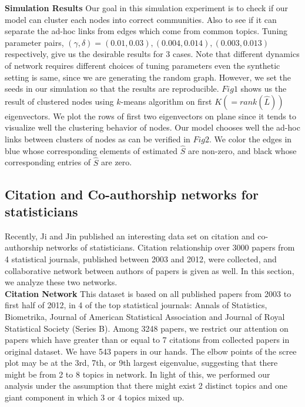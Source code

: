 \documentclass{article}
\begin{document}
\noindent \textbf{Simulation Results} Our goal in this simulation experiment is to check if our model can cluster each nodes into correct communities. Also to see if it can separate the ad-hoc links from edges which come from common topics. Tuning parameter pairs, $(\gamma,\delta) = (0.01,0.03),(0.004,0.014),(0.003,0.013)$ respectively, give us the desirable results for 3 cases. Note that different dynamics of network requires different choices of tuning parameters even the synthetic setting is same, since we are generating the random graph. However, we set the seeds in our simulation so that the results are reproducible. $Fig1$ shows us the result of clustered nodes using $k$-means algorithm on first $K(=rank(\hat{L}))$ eigenvectors. We plot the rows of first two eigenvectors on plane since it tends to visualize well the clustering behavior of nodes. Our model chooses well the ad-hoc links between clusters of nodes as can be verified in $Fig2$. We color the edges in blue whose corresponding elements of estimated $\hat{S}$ are non-zero, and black whose corresponding entries of $\hat{S}$ are zero. 

\subsection{Citation and Co-authorship networks for statisticians }
Recently, Ji and Jin \cite{ji2016coauthorship} published an interesting data set on citation  and co-authorship networks of statisticians. Citation relationship over 3000 papers from 4 statistical journals, published between 2003 and 2012, were collected, and collaborative network between authors of papers is given as well. In this section, we analyze these two networks. \\ 

\noindent\textbf{Citation Network} This dataset is based on all published papers from 2003 to first half of 2012, in 4 of the top statistical journals: Annals of Statistics, Biometrika, Journal of American Statistical Association and Journal of Royal Statistical Society (Series B). Among  3248 papers, we restrict our attention on papers which have greater than or equal to 7 citations from collected papers in original dataset. We have 543 papers in our hands. The elbow points of the scree plot may be at the 3rd, 7th, or 9th largest eigenvalue, suggesting that there might be from 2 to 8 topics in network. In light of this, we performed our analysis under the assumption that there might exist 2 distinct topics and one giant component in which 3 or 4 topics mixed up. \\
\end{document}
